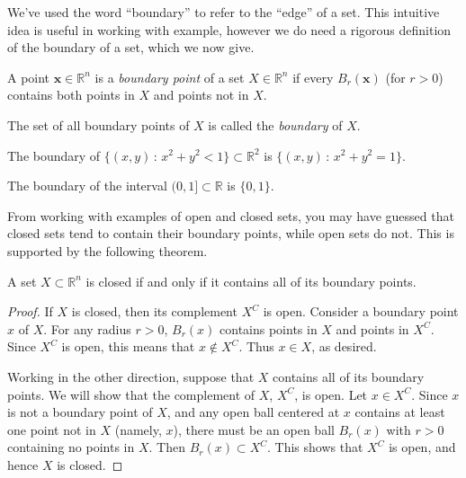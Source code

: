 \documentclass{ximera}
\begin{document}
We've used the word ``boundary'' to refer to the ``edge'' of a set. This intuitive idea is useful in working with example, however we do need a rigorous definition of the boundary of a set, which we now give.

\begin{definition}
A point $\mathbf{x}\in\mathbb{R}^n$ is a \emph{boundary point} of a set $X\in \mathbb{R}^n$ if every $B_r(\mathbf{x})$ (for $r>0$) contains both points in $X$ and points not in $X$.

The set of all boundary points of $X$ is called the \emph{boundary} of $X$.
\end{definition}

\begin{example}

The boundary of $\{(x,y)\,:\,x^2+y^2<1\}\subset\mathbb{R}^2$ is $\{(x,y)\,:\,x^2+y^2=1\}$. %

The boundary of the interval $(0,1]\subset\mathbb{R}$ is $\{0,1\}$.

\end{example}

From working with examples of open and closed sets, you may have guessed that closed sets tend to contain their boundary points, while open sets do not. This is supported by the following theorem.

\begin{theorem}
A set $X\subset\mathbb{R}^n$ is closed if and only if it contains all of its boundary points.
\end{theorem}

\begin{proof}
If $X$ is closed, then its complement $X^C$ is open. Consider a boundary point $x$ of $X$. For any radius $r>0$, $B_r(x)$ contains points in $X$ and points in $X^C$. Since $X^C$ is open, this means that $x\notin X^C$. Thus $x\in X$, as desired.

Working in the other direction, suppose that $X$ contains all of its boundary points. We will show that the complement of $X$, $X^C$, is open. Let $x\in X^C$. Since $x$ is not a boundary point of $X$, and any open ball centered at $x$ contains at least one point not in $X$ (namely, $x$), there must be an open ball $B_r(x)$ with $r>0$ containing no points in $X$. Then $B_r(x)\subset X^C$. This shows that $X^C$ is open, and hence $X$ is closed.
\end{proof}
\end{document}
